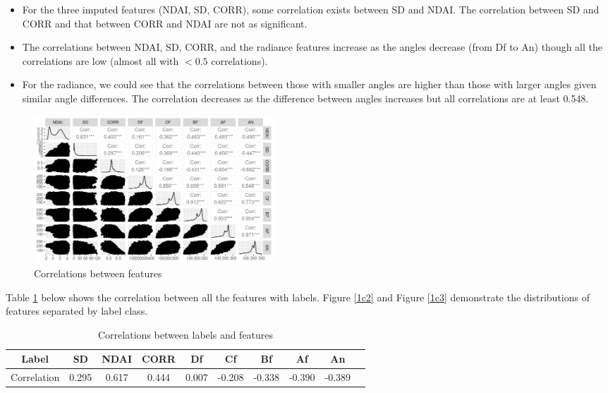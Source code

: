 \documentclass[11pt]{article}
\theoremstyle{definition}
\begin{document}
\begin{itemize}
\item For the three imputed features (NDAI, SD, CORR), some correlation exists between SD and NDAI. The correlation between SD and CORR and that between CORR and NDAI are not as significant.

\item The correlations between NDAI, SD, CORR, and the radiance features increase as the angles decrease (from Df to An) though all the correlations are low (almost all with \(<0.5\) correlations).

\item For the radiance, we could see that the correlations between those with smaller angles are higher than those with larger angles given similar angle differences. The correlation decreases as the difference between angles increases but all correlations are at least 0.548.
\end{itemize}


\begin{figure}[h]
\centering
\includegraphics[width=9cm]{figures/1c1.png}
\caption{Correlations between features}
\label{1c1}
\end{figure}
\FloatBarrier

Table \ref{cor} below shows the correlation between all the features with labels. Figure \ref{1c2} and Figure \ref{1c3} demonstrate the distributions of features separated by label class.

\begin{table}[h]
    \centering
    \begin{tabular}{c||c|c|c|c|c|c|c|c|c}
    Label  & SD & NDAI & CORR & Df & Cf & Bf & Af & An \\
    \hline
    \hline
    Correlation & 0.295 & 0.617 & 0.444  & 0.007 & -0.208 & -0.338 & -0.390 & -0.389 \\

    \end{tabular}
    \caption{Correlations between labels and features}
    \label{cor}
\end{table}
\FloatBarrier
\end{document}
